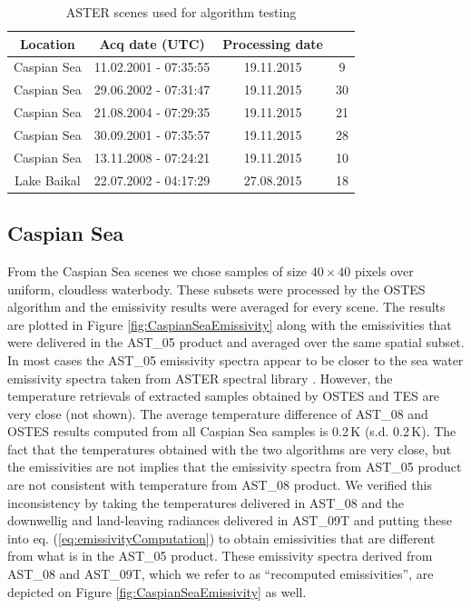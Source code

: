 \begin{table}[!t]
\vspace{0.5em}
\footnotesize
\centering
\begin{tabular}{cccc}
\toprule Location & Acq date (UTC) & Processing date & \parbox[c][1.4cm][c]{1.8cm}{} \\ \hline
Caspian Sea & 11.02.2001 - 07:35:55 & 19.11.2015 &  { 9} \\
Caspian Sea & 29.06.2002 - 07:31:47 & 19.11.2015 &  {30} \\
Caspian Sea & 21.08.2004 - 07:29:35 & 19.11.2015 &  {21} \\
Caspian Sea & 30.09.2001 - 07:35:57 & 19.11.2015 &  {28} \\
Caspian Sea & 13.11.2008 - 07:24:21 & 19.11.2015 &  {10} \\
Lake Baikal & 22.07.2002 - 04:17:29 & 27.08.2015 &  {18} \\

\bottomrule
\end{tabular}
\vspace{1.5 em}
\caption{ASTER scenes used for algorithm testing}
\label{table:ASTERScenes}
\normalsize
\end{table}

\subsection*{Caspian Sea}

From the Caspian Sea scenes we chose samples of size $40 \times 40$ pixels over uniform, cloudless waterbody. These subsets were processed by the OSTES algorithm and the emissivity results were averaged for every scene. The results are plotted in Figure \ref{fig:CaspianSeaEmissivity} along with the emissivities that were delivered in the AST\_05 product and averaged over the same spatial subset. In most cases the AST\_05 emissivity spectra appear to be closer to the sea water emissivity spectra taken from ASTER spectral library \cite{BH09}. However, the temperature retrievals of extracted samples obtained by OSTES and TES are very close (not shown). The average temperature difference of AST\_08 and OSTES results computed from all Caspian Sea samples is 0.2\,K (s.d. 0.2\,K). The fact that the temperatures obtained with the two algorithms are very close, but the emissivities are not implies that the emissivity spectra from AST\_05 product are not consistent with temperature from AST\_08 product. We verified this inconsistency by taking the temperatures delivered in AST\_08 and the downwellig and land-leaving radiances delivered in AST\_09T and putting these into eq. (\ref{eq:emissivityComputation}) to obtain emissivities that are different from what is in the AST\_05 product. These emissivity spectra derived from AST\_08 and AST\_09T, which we refer to as ``recomputed emissivities'', are depicted on Figure \ref{fig:CaspianSeaEmissivity} as well. 

